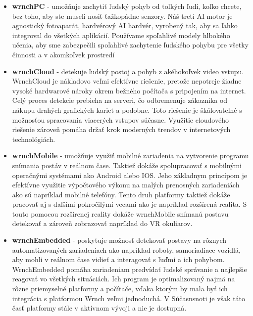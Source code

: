 \documentclass[slovak,master,dept460,male,cpp,cpdeclaration]{diploma}
\begin{document}
\begin{itemize}
\item \textbf{wrnchPC} - umožňuje zachytiť ľudský pohyb od toľkých ľudí, koľko chcete, bez toho, aby ste museli nosiť ťažkopádne senzory. Náš tretí AI motor je agnostický fotoaparát, hardvérový AI hardvér, vyrobený tak, aby sa ľahko integroval do všetkých aplikácií. Používame spoľahlivé modely hlbokého učenia, aby sme zabezpečili spoľahlivé zachytenie ľudského pohybu pre všetky činnosti a v akomkoľvek prostredí


\item \textbf{wrnchCloud} - detekuje ľudský postoj a pohyb z akéhokoľvek video vstupu. WrnchCloud je nákladovo veľmi efektívne riešenie, pretože nepotreje žiadne vysoké hardwarové nároky okrem bežného počítača s pripojením na internet. Celý proces detekcie prebieha na serveri, čo odbremenuje zákaznika od nákupu drahých grafických kariet a podobne. Toto riešenie je škálovateľné s možnosťou spracovania viacerých vstupov súčasne. Využitie cloudového riešenie zároveň pomáha držať krok moderných trendov v internetových technológiách.

\item \textbf{wrnchMobile } - umožňuje využiť mobilné zariadenia na vytvorenie programu snímania postáv v reálnom čase. Taktiež dokáže spolupracovať s mobilnými operačnými systémami ako Android alebo IOS. Jeho základnym princípom je efektívne využitie výpočtového výkonu  na malých prenosných zariadeniách ako sú napríklad mobilné telefóny. Tento druh platformy taktiež dokáže pracovať aj s dalšími pokročilými vecami ako je napríklad rozšírená realita. S touto pomocou rozšírenej reality dokáže wrnchMobile snímanú postavu detekovať a zároveň zobrazovať napríklad do VR okuliarov.


\item \textbf{wrnchEmbedded} - poskytuje možnosť detekovať postavy na rôznych automatizovaných zariadeniach ako napríklad roboty,  samoriadiace vozidlá, aby mohli v reálnom čase vidieť a interagovať s ľuďmi a ich pohybom. WrnchEmbedded pomáha zariadeniam predvídať ľudské správanie a najlepšie reagovať vo všetkých situáciách. Ich program je optimalizovaný najmä na rôzne priemyselné platformy a počítače, vďaka ktorým by mala byť ich integrácia s platformou Wrnch veľmi jednoduchá. V Súčasnsnoti je však táto časť platformy stále v aktívnom vývoji a nie je dostupná. 
\end{itemize}
\end{document}
